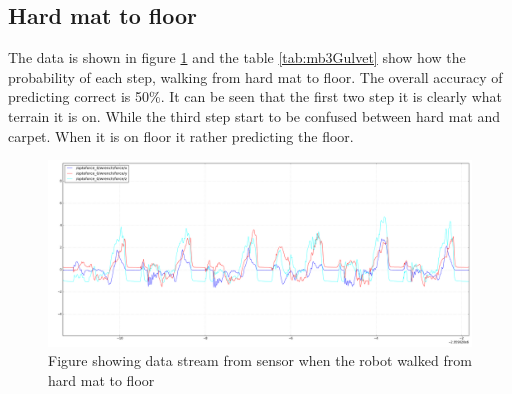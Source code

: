 \documentclass[USenglish]{ifimaster}  %
\begin{document}
	\clearpage
\subsection{Hard mat to floor} \label{subsec:hmf}
The data is shown in figure \ref{fig:mb3Gulvet} and the table \ref{tab:mb3Gulvet} show how the probability of each step, walking from hard mat to floor. The overall accuracy of predicting correct is 50\%. It can be seen that the first two step it is clearly what terrain it is on. While the third step start to be confused between hard mat and carpet. When it is on floor it rather predicting the floor.
	
	
	
	\begin{figure}[h]
		\centering
		\includegraphics[width=\textwidth,height=\textheight,keepaspectratio]{Figures/MB3_3_Gulvet}
		\caption{Figure showing data stream from sensor when the robot walked from hard mat to floor}
		\label{fig:mb3Gulvet}
	\end{figure}
	
	
	\begin{table}[h]
		\centering
		\caption{The table showing probability of each terrain per step walking from hard mat to floor. Marked green represent correct prediction and correct terrain, red represent wrong prediction and yellow is the correct prediction if it got wrong.}
		\label{tab:mb3Gulvet}
	\end{table}
	
\end{document}

